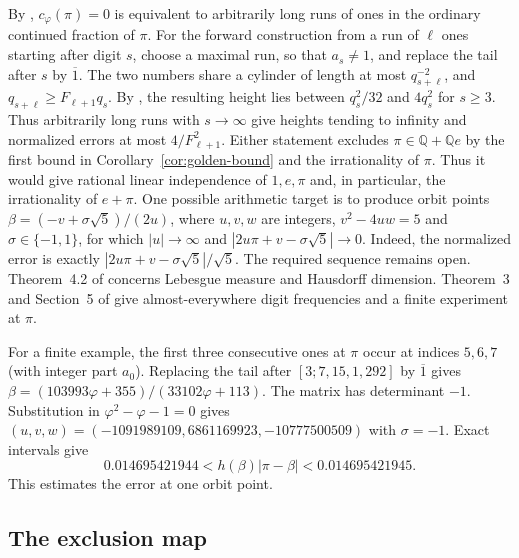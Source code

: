 \documentclass[11pt]{amsart}
\theoremstyle{definition}
\theoremstyle{remark}
\numberwithin{equation}{section}
\newcommand{\Q}{\mathbb{Q}}
\begin{document}
By \cite[Lemma~4.1]{BugeaudQuad}, $c_\varphi(\pi)=0$ is equivalent to
arbitrarily long runs of ones in the ordinary continued fraction of $\pi$.
For the forward construction from a run of $\ell$ ones starting after
digit $s$, choose a maximal run, so that $a_s\ne1$, and replace the
tail after $s$ by $\overline{1}$. The two numbers share a cylinder
of length at most $q_{s+\ell}^{-2}$, and
$q_{s+\ell}\ge F_{\ell+1}q_s$.
By \cite[Lemma~2.1]{BugeaudQuad}, the resulting height lies between
$q_s^2/32$ and $4q_s^2$ for $s\ge3$. Thus arbitrarily long runs with
$s\to\infty$ give heights tending to infinity and normalized errors
at most $4/F_{\ell+1}^2$.
Either statement excludes $\pi\in\Q+\Q e$ by the first bound in
Corollary~\ref{cor:golden-bound} and the irrationality of $\pi$.
Thus it would give rational linear independence of $1,e,\pi$ and,
in particular, the irrationality of $e+\pi$.
One possible arithmetic target is to produce orbit points
$\beta=(-v+\sigma\sqrt5)/(2u)$, where $u,v,w$ are integers,
$v^2-4uw=5$ and $\sigma\in\{-1,1\}$, for which $|u|\to\infty$ and
$|2u\pi+v-\sigma\sqrt5|\to0$. Indeed, the normalized error is exactly
$|2u\pi+v-\sigma\sqrt5|/\sqrt5$. The required sequence remains open.
Theorem~4.2 of \cite{BugeaudQuad} concerns Lebesgue measure and
Hausdorff dimension. Theorem~3 and Section~5 of \cite{Hildebrand2024}
give almost-everywhere digit frequencies and a finite experiment at $\pi$.

For a finite example, the first three consecutive ones at $\pi$ occur
at indices $5,6,7$ (with integer part $a_0$).
Replacing the tail after $[3;7,15,1,292]$ by $\overline{1}$ gives
$\beta=(103993\varphi+355)/(33102\varphi+113)$. The matrix has
determinant $-1$. Substitution in $\varphi^2-\varphi-1=0$ gives
$(u,v,w)=(-1091989109,6861169923,-10777500509)$ with $\sigma=-1$.
Exact intervals give
\[
  0.014695421944 < h(\beta)|\pi-\beta| < 0.014695421945 .
\]
This estimates the error at one orbit point.

\subsection{The exclusion map}
\end{document}
